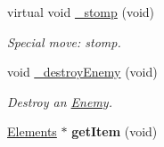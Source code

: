 \begin{DoxyCompactItemize}
virtual void \hyperlink{class_characters_afa31b96a1c45d6f6c950e3f7e107f32f}{\+\_\+stomp} (void)
\begin{DoxyCompactList}\small\item\em Special move\+: stomp. \end{DoxyCompactList}\item 
void \hyperlink{class_characters_a98666bfdc74679e0ab605a4f6a89ecb2}{\+\_\+destroy\+Enemy} (void)
\begin{DoxyCompactList}\small\item\em Destroy an \hyperlink{class_enemy}{Enemy}. \end{DoxyCompactList}\item 
\hypertarget{class_characters_afa156915fdb0e77146574d883738a287}{\hyperlink{class_elements}{Elements} $\ast$ {\bfseries get\+Item} (void)}\label{class_characters_afa156915fdb0e77146574d883738a287}

\end{DoxyCompactItemize}
